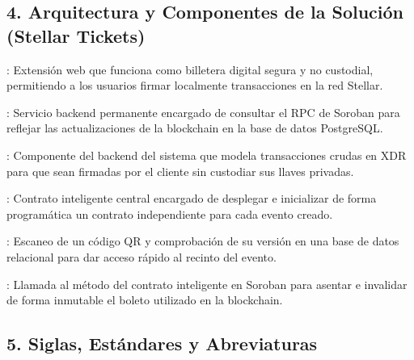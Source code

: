 \subsection*{4. Arquitectura y Componentes de la Solución (Stellar Tickets)}

\begin{description}\setlength{\itemsep}{2pt}
\item[Freighter]: Extensión web que funciona como billetera digital segura y no custodial, permitiendo a los
usuarios firmar localmente transacciones en la red Stellar.
\item[Indexador (\textit{Indexer})]: Servicio backend permanente encargado de consultar el RPC de Soroban
para reflejar las actualizaciones de la blockchain en la base de datos PostgreSQL.
\item[Proxy XDR]: Componente del backend del sistema que modela transacciones crudas en XDR para que sean
firmadas por el cliente sin custodiar sus llaves privadas.
\item[Contrato fábrica (\textit{Factory contract})]: Contrato inteligente central encargado de desplegar e
inicializar de forma programática un contrato independiente para cada evento creado.
\item[Redención operativa]: Escaneo de un código QR y comprobación de su versión en una base de datos
relacional para dar acceso rápido al recinto del evento.
\item[Redención on-chain]: Llamada al método del contrato inteligente en Soroban para asentar e invalidar de
forma inmutable el boleto utilizado en la blockchain.
\end{description}

\subsection*{5. Siglas, Estándares y Abreviaturas}

